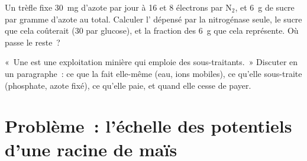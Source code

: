 \begin{exercise}[$\star\star\star$]\label{exo:b1:plant-water-minerals:11}
Un trèfle fixe \qty{30}{mg} d'azote par jour à \qty{16}{}  et
\qty{8}{} électrons par $\mathrm{N_2}$, et \qty{6}{g} de sucre par
gramme d'azote au total. Calculer l' dépensé par la nitrogénase
seule, le sucre que cela coûterait (30  par glucose), et la
fraction des \qty{6}{g} que cela représente. Où passe le reste~?
\end{exercise}

\begin{exercise}[$\star\star\star$]\label{exo:b1:plant-water-minerals:12}
«~Une  est une exploitation minière qui emploie des
sous-traitants.~» Discuter en un paragraphe~: ce que la  fait
elle-même (eau, ions mobiles), ce qu'elle sous-traite (phosphate, azote
fixé), ce qu'elle paie, et quand elle cesse de payer.
\end{exercise}

\section{Problème~: l'échelle des potentiels d'une racine de maïs}

